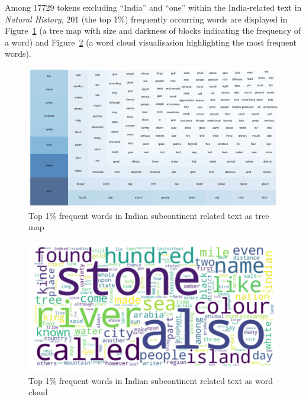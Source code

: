 \documentclass[
  12pt,
]{article}
\begin{document}
Among 17729 tokens excluding ``India'' and ``one'' within the
India-related text in \emph{Natural History}, 201 (the top 1\%)
frequently occurring words are displayed in
Figure~\ref{fig-freqwords_treemap} (a tree map with size and darkness of
blocks indicating the frequency of a word) and
Figure~\ref{fig-freqwords_wordcloud} (a word cloud visualisasion
highlighting the most frequent words).

\begin{figure}

{\centering \includegraphics{NHthesis_structure_files/figure-pdf/fig-freqwords_treemap-output-1.png}

}

\caption{\label{fig-freqwords_treemap}Top 1\% frequent words in Indian
subcontinent related text as tree map}

\end{figure}

\begin{figure}

{\centering \includegraphics{NHthesis_structure_files/figure-pdf/fig-freqwords_wordcloud-output-1.png}

}

\caption{\label{fig-freqwords_wordcloud}Top 1\% frequent words in Indian
subcontinent related text as word cloud}

\end{figure}
\end{document}
